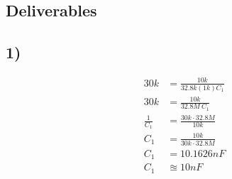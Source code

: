 \documentclass[]{IEEEtran}
\begin{document}
\begin{multicols}{2}
\section{Deliverables}
\subsection{1)}
\begin{equation*}
	\begin{split}
		30k&=\frac{10k}{32.8k(1k)C_1}\\
		30k&=\frac{10k}{32.8M\ C_1}\\
		\frac{1}{C_1}&=\frac{30k\cdot32.8M}{10k}\\
		C_1&=\frac{10k}{30k\cdot32.8M}\\
		C_1&=10.1626nF\\
		C_1&\approxeq10nF\\
		\end{split}
\end{equation*}

\end{multicols}
\end{document}
